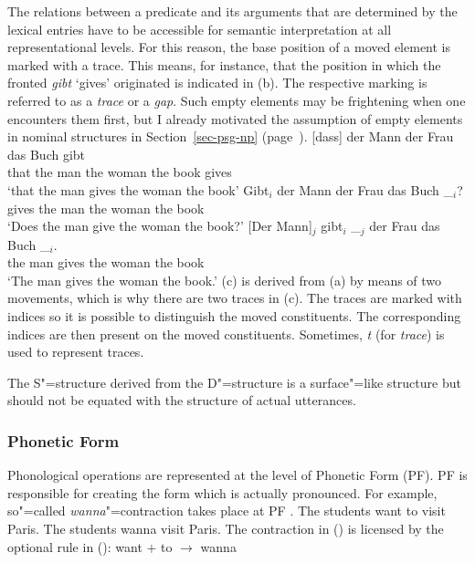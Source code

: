The relations between a predicate and its arguments that are determined by the lexical entries have to be accessible for semantic interpretation at all 
representational levels. For this reason, the base position of a moved element is marked with a
trace. This means, for instance, that the position in which the
fronted \emph{gibt} `gives' originated is indicated in (b). The respective marking is
referred to as a \emph{trace} or a \emph{gap}. Such empty elements may be
frightening when one encounters them first, but I already motivated the assumption
of empty elements in nominal structures in Section~\ref{sec-psg-np}  (page~\pageref{np-epsilon}). 
\eal
\ex 
\gll {}[dass] der Mann der Frau das Buch gibt\\
	 {}\spacebr{}that the man the woman the book gives\\
\glt `that the man gives the woman the book'
\ex 
\gll Gibt$_i$ der Mann der Frau das Buch \_$_i$?\\
	 gives the man the woman the book\\
\glt `Does the man give the woman the book?'
\ex 
\gll {}[Der Mann]$_j$ gibt$_i$ \_$_j$ der Frau das Buch \_$_i$.\\
	 {}\spacebr{}the man gives {} the woman the book\\
\glt `The man gives the woman the book.'
\zl
(c) is derived from (a) by means of two movements, which is why there are two traces in (c). The traces are marked with
indices so it is possible to distinguish the moved constituents. The corresponding indices are then present on the moved constituents. Sometimes, \emph{t} (for \emph{trace}) is used to represent traces.

The S"=structure derived from the D"=structure is a surface"=like structure but should not be equated with the structure of actual utterances.

\subsubsection{Phonetic Form}

\largerpage
Phonological operations are represented at the level of Phonetic Form (PF). PF is responsible for creating the form which
is actually pronounced. For example, so"=called \emph{wanna}"=contraction takes place at PF \citep[--21]{Chomsky81a}.
\eal
\ex The students want to visit Paris.
\ex The students wanna visit Paris.
\zl
The contraction in () is licensed by the optional rule in ():
\ea
want $+$ to $\to$ wanna
\z
{}

